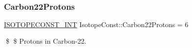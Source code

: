 \subsubsection{\texorpdfstring{Carbon22\+Protons}{Carbon22Protons}}
{\footnotesize\ttfamily \mbox{\hyperlink{group___isotope_const-_macros_ga5f18360b3e99483a35c32d789e62621c}{I\+S\+O\+T\+O\+P\+E\+C\+O\+N\+S\+T\+\_\+\+I\+NT}} Isotope\+Const\+::\+Carbon22\+Protons = 6}

\$ \$ Protons in Carbon-\/22. 